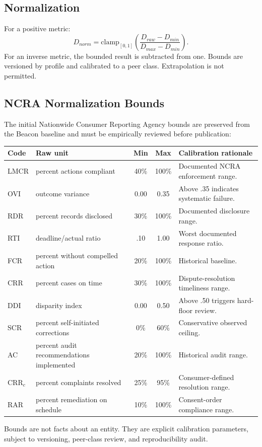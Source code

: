\subsection{Normalization}

For a positive metric:
\[
D_{norm}=\mathrm{clamp}_{[0,1]}\left(\frac{D_{raw}-D_{min}}{D_{max}-D_{min}}\right).
\]
For an inverse metric, the bounded result is subtracted from one. Bounds are
versioned by profile and calibrated to a peer class. Extrapolation is not
permitted.

\subsection{NCRA Normalization Bounds}
\label{sec:cra-bounds}

The initial Nationwide Consumer Reporting Agency bounds are preserved from the
Beacon baseline and must be empirically reviewed before publication:

\begin{center}
\begin{tabular}{p{2cm}p{3.3cm}ccp{6cm}}
\toprule
Code & Raw unit & Min & Max & Calibration rationale \\
\midrule
LMCR & percent actions compliant & 40\% & 100\% & Documented NCRA enforcement range. \\
OVI & outcome variance & 0.00 & 0.35 & Above .35 indicates systematic failure. \\
RDR & percent records disclosed & 30\% & 100\% & Documented disclosure range. \\
RTI & deadline/actual ratio & .10 & 1.00 & Worst documented response ratio. \\
FCR & percent without compelled action & 20\% & 100\% & Historical baseline. \\
CRR & percent cases on time & 30\% & 100\% & Dispute-resolution timeliness range. \\
DDI & disparity index & 0.00 & 0.50 & Above .50 triggers hard-floor review. \\
SCR & percent self-initiated corrections & 0\% & 60\% & Conservative observed ceiling. \\
AC & percent audit recommendations implemented & 20\% & 100\% & Historical audit range. \\
CRR$_c$ & percent complaints resolved & 25\% & 95\% & Consumer-defined resolution range. \\
RAR & percent remediation on schedule & 10\% & 100\% & Consent-order compliance range. \\
\bottomrule
\end{tabular}
\end{center}

Bounds are not facts about an entity. They are explicit calibration parameters,
subject to versioning, peer-class review, and reproducibility audit.
